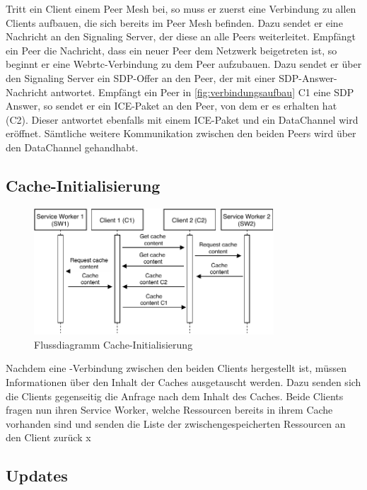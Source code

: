 Tritt ein Client einem Peer Mesh bei, so muss er zuerst eine Verbindung zu allen Clients aufbauen, die sich bereits im Peer Mesh befinden. Dazu sendet er eine Nachricht an den Signaling Server, der diese an alle Peers weiterleitet. Empfängt ein Peer die Nachricht, dass ein neuer Peer dem Netzwerk beigetreten ist, so beginnt er eine Webrtc-Verbindung zu dem Peer aufzubauen. Dazu sendet er über den Signaling Server ein SDP-Offer an den Peer, der mit einer SDP-Answer-Nachricht antwortet. Empfängt ein Peer in \ref{fig:verbindungsaufbau} C1 eine SDP Answer, so sendet er ein ICE-Paket an den Peer, von dem er es erhalten hat (C2). Dieser antwortet ebenfalls mit einem ICE-Paket und ein DataChannel wird eröffnet. Sämtliche weitere Kommunikation zwischen den beiden Peers wird über den DataChannel gehandhabt. 

\subsection{Cache-Initialisierung}
\begin{figure}[!h]
	\centering
	\includegraphics[width=0.8\textwidth]{figures/cache_initialisierung}
	\caption[Flussdiagramm Cache-Initialisierung]{Flussdiagramm Cache-Initialisierung}
	\label{fig:cache_initialisierung}
\end{figure}

Nachdem eine \webrtc-Verbindung zwischen den beiden Clients hergestellt ist, müssen Informationen über den Inhalt der Caches ausgetauscht werden. Dazu senden sich die Clients gegenseitig die Anfrage nach dem Inhalt des Caches. Beide Clients fragen nun ihren Service Worker, welche Ressourcen bereits in ihrem Cache vorhanden sind und senden die Liste der zwischengespeicherten Ressourcen an den Client zurück
x
\subsection{Updates}

